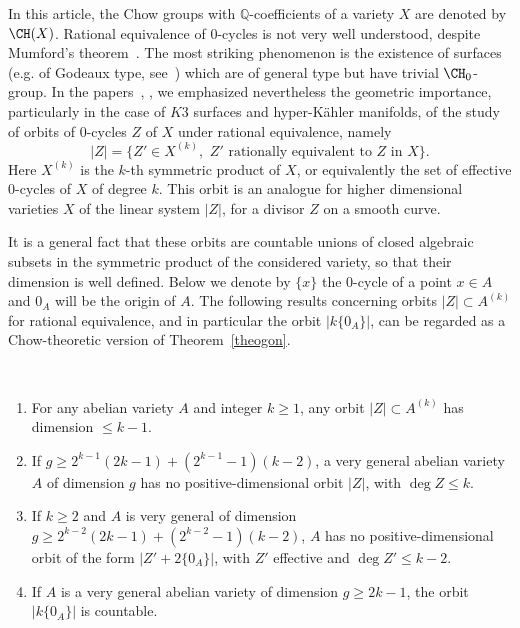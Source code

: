 In this article, the Chow groups with $\mathbb{Q}$-coefficients of a variety $X$ are denoted by $\CH(X)$. Rational equivalence of $0$-cycles is not very well understood, despite Mumford's theorem~\cite{mumford}. The most striking phenomenon is the existence of surfaces (e.g. of Godeaux type, see~\cite{voisingodeaux}) which are of general type but have trivial $\CH_0$-group. In the papers~\cite{voisink3}, \cite{voisinisot}, we emphasized nevertheless the geometric importance, particularly in the case of $K3$ surfaces and hyper-K\"ahler manifolds, of the study of orbits of $0$-cycles $Z$ of $X$ under rational equivalence, namely
\[
| Z|=\{Z'\in X^{(k)},\,\,Z'\,\,\text{rationally equivalent to } Z \text{ in }X\}.
\]
Here $X^{(k)}$ is the $k$-th symmetric product of $X$, or equivalently the set of effective $0$-cycles of $X$ of degree $k$. This orbit is an analogue for higher dimensional varieties $X$ of the linear system $|Z|$, for a divisor $Z$ on a smooth curve.

It is a general fact that these orbits are countable unions of closed algebraic subsets in the symmetric product of the considered variety, so that their dimension is well defined. Below we denote by $\{x\}$ the $0$-cycle of a point $x\in A$ and $0_A$ will be the origin of $A$. The following results concerning orbits $|Z|\subset A^{(k)}$ for rational equivalence, and in particular the orbit $|k\{0_A\}|$, can be regarded as a Chow-theoretic version of Theorem~\ref{theogon}.

\begin{theoc}\ \label{coroorbit}
\begin{enumerate}%
\item \label{1.4.1} For any abelian variety $A$ and integer $k\geq 1$, any orbit $|Z|\subset A^{(k)}$ has dimension $\leq k-1$.

\item \label{1.4.2} If $g\geq 2^{k-1}(2k-1)+(2^{k-1}-1)(k-2)$, a very general abelian variety $A$ of dimension $g$ has no positive-dimensional orbit $|Z|$, with $\deg Z\leq k$.

\item \label{1.4.3} If $k\geq 2$ and $A$ is very general of dimension $g\geq 2^{k-2}(2k-1)+(2^{k-2}-1)(k-2)$, $A$ has no positive-dimensional orbit of the form $|Z'+2\{0_A\}|$, with $Z'$ effective and $\deg Z'\leq k-2$.

\item \label{1.4.4} If $A$ is a very general abelian variety of dimension $g\geq 2k-1$, the orbit $|k\{0_A\}|$ is countable.
\end{enumerate}
\end{theoc}

